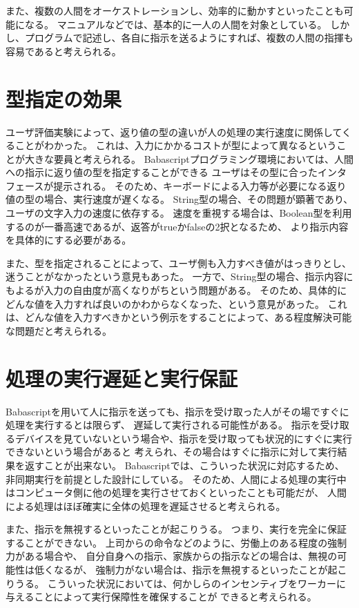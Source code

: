 また、複数の人間をオーケストレーションし、効率的に動かすといったことも可能になる。
マニュアルなどでは、基本的に一人の人間を対象としている。
しかし、プログラムで記述し、各自に指示を送るようにすれば、複数の人間の指揮も容易であると考えられる。

\section{型指定の効果}\label{ux578bux6307ux5b9aux306eux52b9ux679c}

ユーザ評価実験によって、返り値の型の違いが人の処理の実行速度に関係してくることがわかった。
これは、入力にかかるコストが型によって異なるということが大きな要員と考えられる。
Babascriptプログラミング環境においては、人間への指示に返り値の型を指定することができる
ユーザはその型に合ったインタフェースが提示される。
そのため、キーボードによる入力等が必要になる返り値の型の場合、実行速度が遅くなる。
String型の場合、その問題が顕著であり、ユーザの文字入力の速度に依存する。
速度を重視する場合は、Boolean型を利用するのが一番高速であるが、返答がtrueかfalseの2択となるため、
より指示内容を具体的にする必要がある。

また、型を指定されることによって、ユーザ側も入力すべき値がはっきりとし、迷うことがなかったという意見もあった。
一方で、String型の場合、指示内容にもよるが入力の自由度が高くなりがちという問題がある。
そのため、具体的にどんな値を入力すれば良いのかわからなくなった、という意見があった。
これは、どんな値を入力すべきかという例示をすることによって、ある程度解決可能な問題だと考えられる。

\section{処理の実行遅延と実行保証}\label{ux51e6ux7406ux306eux5b9fux884cux9045ux5ef6ux3068ux5b9fux884cux4fddux8a3c}

Babascriptを用いて人に指示を送っても、指示を受け取った人がその場ですぐに処理を実行するとは限らず、
遅延して実行される可能性がある。
指示を受け取るデバイスを見ていないという場合や、指示を受け取っても状況的にすぐに実行できないという場合があると
考えられ、その場合はすぐに指示に対して実行結果を返すことが出来ない。
Babascriptでは、こういった状況に対応するため、非同期実行を前提とした設計にしている。
そのため、人間による処理の実行中はコンピュータ側に他の処理を実行させておくといったことも可能だが、
人間による処理はほぼ確実に全体の処理を遅延させると考えられる。

また、指示を無視するといったことが起こりうる。
つまり、実行を完全に保証することができない。
上司からの命令などのように、労働上のある程度の強制力がある場合や、
自分自身への指示、家族からの指示などの場合は、無視の可能性は低くなるが、
強制力がない場合は、指示を無視するといったことが起こりうる。
こういった状況においては、何かしらのインセンティブをワーカーに与えることによって実行保障性を確保することが
できると考えられる。


